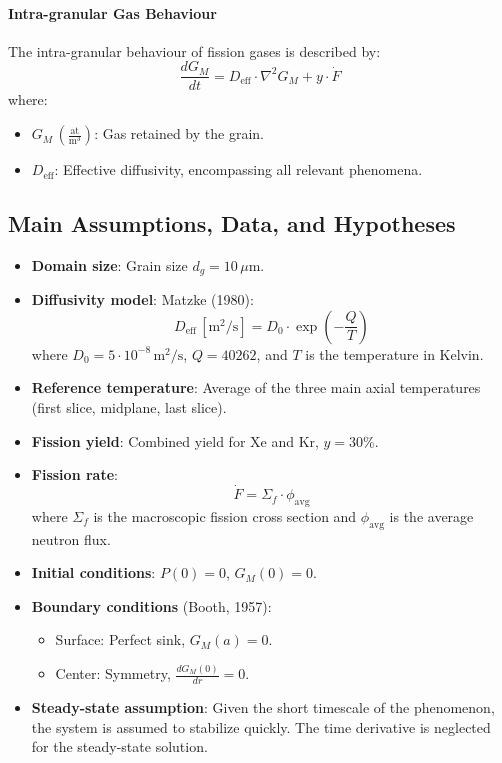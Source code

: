 \paragraph{Intra-granular Gas Behaviour}
The intra-granular behaviour of fission gases is described by:
\begin{equation}
    \frac{dG_M}{dt} = D_{\text{eff}} \cdot \nabla^2 G_M + y \cdot \dot{F}
\end{equation}
where:
\begin{itemize}
    \item $G_M \, \left(\frac{\text{at}}{\text{m}^3}\right)$: Gas retained by the grain.
    \item $D_{\text{eff}}$: Effective diffusivity, encompassing all relevant phenomena.
\end{itemize}

\subsection{Main Assumptions, Data, and Hypotheses}

\begin{itemize}
    \item \textbf{Domain size}: Grain size $d_g = 10\,\mu \text{m}$.
    \item \textbf{Diffusivity model}: Matzke (1980):
    \begin{equation}
        D_{\text{eff}} \, [\text{m}^2/\text{s}] = D_0 \cdot \exp\left(-\frac{Q}{T}\right)
    \end{equation}
    where $D_0 = 5 \cdot 10^{-8} \, \text{m}^2/\text{s}$, $Q = 40262$, and $T$ is the temperature in Kelvin.
    \item \textbf{Reference temperature}: Average of the three main axial temperatures (first slice, midplane, last slice).
    \item \textbf{Fission yield}: Combined yield for Xe and Kr, $y = 30\%$.
    \item \textbf{Fission rate}:
    \begin{equation}
        \dot{F} = \Sigma_f \cdot \phi_{\text{avg}}
    \end{equation}
    where $\Sigma_f$ is the macroscopic fission cross section and $\phi_{\text{avg}}$ is the average neutron flux.
    \item \textbf{Initial conditions}: $P(0) = 0$, $G_M(0) = 0$.
    \item \textbf{Boundary conditions} (Booth, 1957):
    \begin{itemize}
        \item Surface: Perfect sink, $G_M(a) = 0$.
        \item Center: Symmetry, $\frac{dG_M(0)}{dr} = 0$.
    \end{itemize}
    \item \textbf{Steady-state assumption}: Given the short timescale of the phenomenon, the system is assumed to stabilize quickly. The time derivative is neglected for the steady-state solution.
\end{itemize}

